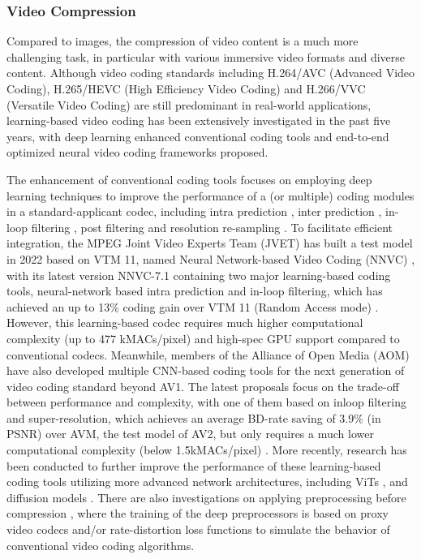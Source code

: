 \documentclass[11pt,a4paper]{article}
\begin{document}
\subsubsection{Video Compression}

Compared to images, the compression of video content is a much more challenging task, in particular with various immersive video formats and diverse content. Although video coding standards including H.264/AVC (Advanced Video Coding), H.265/HEVC (High Efficiency Video Coding) and H.266/VVC (Versatile Video Coding) are still predominant in real-world applications, learning-based video coding has been extensively investigated in the past five years, with deep learning enhanced conventional coding tools and end-to-end optimized neural video coding frameworks proposed.    

The enhancement of conventional coding tools focuses on employing deep learning techniques to improve the performance of a (or multiple) coding modules in a standard-applicant codec, including intra prediction \cite{li2021deepqtmt}, inter prediction \cite{jin2021deep}, in-loop filtering \cite{feng2024low}, post filtering \cite{zhang2023wcdann} and resolution re-sampling \cite{wang2023compression}. To facilitate efficient integration, the MPEG Joint Video Experts Team (JVET)  has built a test model in 2022 based on VTM 11, named Neural Network-based Video Coding (NNVC) \cite{li2023designs}, with its latest version NNVC-7.1 containing two major learning-based coding tools, neural-network based intra prediction and in-loop filtering, which has achieved an up to 13\% coding gain over VTM 11 (Random Access mode) \cite{JVET-AG0014}. However, this learning-based codec requires much higher computational complexity (up to 477 kMACs/pixel) and high-spec GPU support compared to conventional codecs. Meanwhile, members of the Alliance of Open Media (AOM) have also developed multiple CNN-based coding tools for the next generation of video coding standard beyond AV1. The latest proposals focus on the trade-off between performance and complexity, with one of them based on inloop filtering and super-resolution, which achieves an average BD-rate saving of 3.9\% (in PSNR) over AVM, the test model of AV2, but only requires a much lower computational complexity (below 1.5kMACs/pixel) \cite{joshi2023switchable}. More recently, research has been conducted to further improve the performance of these learning-based coding tools utilizing more advanced network architectures, including ViTs \cite{kathariya2023joint}, and diffusion models \cite{li2024extreme}. There are also investigations on applying preprocessing before compression \cite{chadha2021deep,tan2024joint}, where the training of the deep preprocessors is based on proxy video codecs and/or rate-distortion loss functions to simulate the behavior of conventional video coding algorithms.
\end{document}
